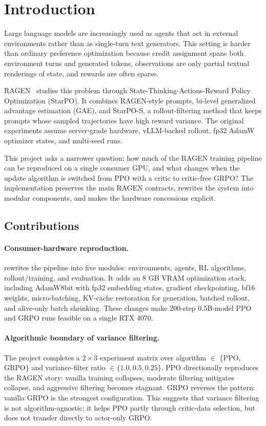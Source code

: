 \section{Introduction}
\label{sec:introduction}

Large language models are increasingly used as agents that act in external environments rather than as single-turn text generators. This setting is harder than ordinary preference optimization because credit assignment spans both environment turns and generated tokens, observations are only partial textual renderings of state, and rewards are often sparse.

RAGEN~\citep{wang2025ragen} studies this problem through State-Thinking-Actions-Reward Policy Optimization (StarPO). It combines RAGEN-style prompts, bi-level generalized advantage estimation (GAE), and StarPO-S, a rollout-filtering method that keeps prompts whose sampled trajectories have high reward variance. The original experiments assume server-grade hardware, vLLM-backed rollout, fp32 AdamW optimizer states, and multi-seed runs.

This project asks a narrower question: how much of the RAGEN training pipeline can be reproduced on a single consumer GPU, and what changes when the update algorithm is switched from PPO with a critic to critic-free GRPO? The implementation preserves the main RAGEN contracts, rewrites the system into modular components, and makes the hardware concessions explicit.

\subsection{Contributions}

\paragraph{Consumer-hardware reproduction.}
\method{} rewrites the pipeline into five modules: environments, agents, RL algorithms, rollout/training, and evaluation. It adds an 8 GB VRAM optimization stack, including AdamW8bit with fp32 embedding states, gradient checkpointing, bf16 weights, micro-batching, KV-cache restoration for generation, batched rollout, and alive-only batch shrinking. These changes make 200-step 0.5B-model PPO and GRPO runs feasible on a single RTX 4070.

\paragraph{Algorithmic boundary of variance filtering.}
The project completes a \(2 \times 3\) experiment matrix over algorithm \(\in\) \{PPO, GRPO\} and variance-filter ratio \(\in \{1.0, 0.5, 0.25\}\). PPO directionally reproduces the RAGEN story: vanilla training collapses, moderate filtering mitigates collapse, and aggressive filtering becomes stagnant. GRPO reverses the pattern: vanilla GRPO is the strongest configuration. This suggests that variance filtering is not algorithm-agnostic; it helps PPO partly through critic-data selection, but does not transfer directly to actor-only GRPO.

